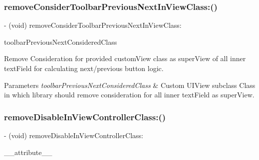 \subsubsection{\texorpdfstring{remove\+Consider\+Toolbar\+Previous\+Next\+In\+View\+Class\+:()}{removeConsiderToolbarPreviousNextInViewClass:()}\hspace{0.1cm}{\footnotesize\ttfamily [3/3]}}
{\footnotesize\ttfamily -\/ (void) remove\+Consider\+Toolbar\+Previous\+Next\+In\+View\+Class\+: \begin{DoxyParamCaption}\item[{(nonnull Class)}]{toolbar\+Previous\+Next\+Considered\+Class }\end{DoxyParamCaption}}

Remove Consideration for provided custom\+View class as super\+View of all inner text\+Field for calculating next/previous button logic.


\begin{DoxyParams}{Parameters}
{\em toolbar\+Previous\+Next\+Considered\+Class} & Custom U\+I\+View subclass Class in which library should remove consideration for all inner text\+Field as super\+View. \\
\hline
\end{DoxyParams}
\mbox{\label{interface_i_q_keyboard_manager_a816df2d7f4896490aba75e0e4172aca8}} 
\subsubsection{\texorpdfstring{remove\+Disable\+In\+View\+Controller\+Class\+:()}{removeDisableInViewControllerClass:()}\hspace{0.1cm}{\footnotesize\ttfamily [1/3]}}
{\footnotesize\ttfamily -\/ (void) remove\+Disable\+In\+View\+Controller\+Class\+: \begin{DoxyParamCaption}\item[{((deprecated(\char`\"{}This method is replaced with remove\+Disable\+Distance\+Handling\+In\+View\+Controller\+Class\+: method to adopt more graceful method name. Some developers confuses with this method name. This method will be removed in upcoming release.\char`\"{})))}]{\+\_\+\+\_\+attribute\+\_\+\+\_\+ }\end{DoxyParamCaption}}

